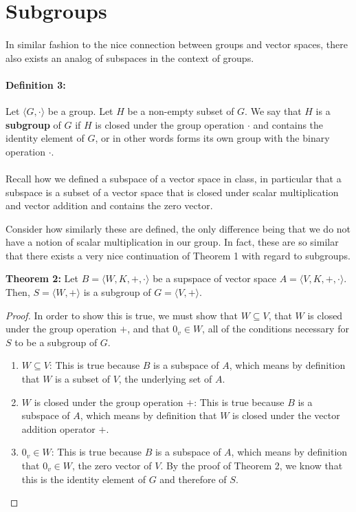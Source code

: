 \documentclass[twoside]{article}
\newcommand{\done}{\renewcommand\qedsymbol{$\blacksquare$}}
\begin{document}
\section{Subgroups}

\paragraph{} In similar fashion to the nice connection between groups and vector spaces,
there also exists an analog of subspaces in the context of groups.
\paragraph*{Definition 3:} Let $\langle G, \cdot \rangle$ be a group. Let $H$ be a non-empty subset of $G$.
We say that $H$ is a \textbf{subgroup} of $G$ if $H$ is closed under the group operation $\cdot$
and contains the identity element of $G$,
or in other words forms its own group with the binary operation $\cdot$.

\paragraph*{} Recall how we defined a subspace of a vector space in class, in 
particular that a subspace is a subset of a vector space that is closed under
scalar multiplication and vector addition and contains the zero vector.

Consider how similarly these are defined, the only difference being that 
we do not have a notion of scalar multiplication in our group. In fact, these 
are so similar that there exists a very nice continuation of Theorem 1 with 
regard to subgroups.

\begin{mdframed}[roundcorner=10pt, backgroundcolor=gray!10]
  \textbf{Theorem 2:} Let $B=\langle W,K,+,\cdot\rangle$ be a supspace of 
    vector space $A=\langle V,K,+,\cdot\rangle$. Then, $S=\langle W,+ \rangle$ is a subgroup of
    $G=\langle V,+ \rangle$.
\end{mdframed}
\begin{proof}
    In order to show this is true, we must show that $W\subseteq V$, that 
    $W$ is closed under the group operation $+$, and that $0_v\in W$, 
    all of the conditions necessary for $S$ to be a subgroup of $G$. 
    \begin{enumerate}
      \item $W\subseteq V$: This is true because $B$ is a subspace of $A$, 
      which means by definition that $W$ is a subset of $V$, the underlying set of $A$.
      \item $W$ is closed under the group operation $+$: This is true because 
      $B$ is a subspace of $A$, which means by definition that $W$ is closed under
      the vector addition operator $+$.
      \item $0_v\in W$: This is true because $B$ is a subspace of $A$, which means by definition that
        $0_v\in W$, the zero vector of $V$. By the proof of Theorem 2, we know that 
        this is the identity element of $G$ and therefore of $S$. 
    \end{enumerate}
\done     
\end{proof}
\end{document}
